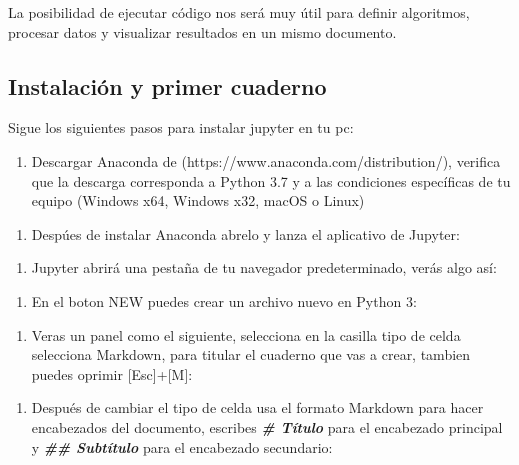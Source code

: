 \documentclass[11pt]{article}
\providecommand{\tightlist}{%
      \setlength{\itemsep}{0pt}\setlength{\parskip}{0pt}}
\begin{document}
La posibilidad de ejecutar código nos será muy útil para definir
algoritmos, procesar datos y visualizar resultados en un mismo
documento.

    \hypertarget{instalaciuxf3n-y-primer-cuaderno}{%
\subsection{Instalación y primer
cuaderno}\label{instalaciuxf3n-y-primer-cuaderno}}

Sigue los siguientes pasos para instalar jupyter en tu pc:

\begin{enumerate}
\def\labelenumi{\arabic{enumi}.}
\tightlist
\item
  Descargar Anaconda de (https://www.anaconda.com/distribution/),
  verifica que la descarga corresponda a Python 3.7 y a las condiciones
  específicas de tu equipo (Windows x64, Windows x32, macOS o Linux)
\end{enumerate}

\begin{enumerate}
\def\labelenumi{\arabic{enumi}.}
\setcounter{enumi}{1}
\tightlist
\item
  Despúes de instalar Anaconda abrelo y lanza el aplicativo de Jupyter:
\end{enumerate}

\begin{enumerate}
\def\labelenumi{\arabic{enumi}.}
\setcounter{enumi}{2}
\tightlist
\item
  Jupyter abrirá una pestaña de tu navegador predeterminado, verás algo
  así:
\end{enumerate}

\begin{enumerate}
\def\labelenumi{\arabic{enumi}.}
\setcounter{enumi}{3}
\tightlist
\item
  En el boton NEW puedes crear un archivo nuevo en Python 3:
\end{enumerate}

\begin{enumerate}
\def\labelenumi{\arabic{enumi}.}
\setcounter{enumi}{4}
\tightlist
\item
  Veras un panel como el siguiente, selecciona en la casilla tipo de
  celda selecciona Markdown, para titular el cuaderno que vas a crear,
  tambien puedes oprimir {[}Esc{]}+{[}M{]}:
\end{enumerate}

\begin{enumerate}
\def\labelenumi{\arabic{enumi}.}
\setcounter{enumi}{5}
\tightlist
\item
  Después de cambiar el tipo de celda usa el formato Markdown para hacer
  encabezados del documento, escribes \textbf{\emph{\# Título}} para el
  encabezado principal y \textbf{\emph{\#\# Subtítulo}} para el
  encabezado secundario:
\end{enumerate}
\end{document}
